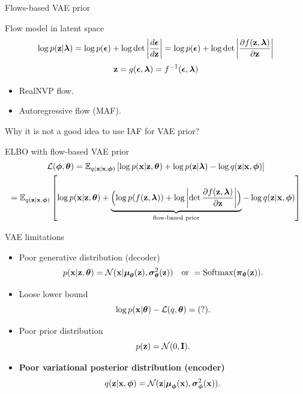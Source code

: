 \begin{frame}{Flows-based VAE prior}
	\begin{block}{Flow model in latent space}
		\vspace{-0.5cm}
		\[
			\log p(\mathbf{z} | \boldsymbol{\lambda}) = \log p(\boldsymbol{\epsilon}) + \log \det \left | \frac{d \boldsymbol{\epsilon}}{d\mathbf{z}}\right| = \log p(\boldsymbol{\epsilon}) + \log \det \left | \frac{\partial f(\mathbf{z}, \boldsymbol{\lambda})}{\partial \mathbf{z}}\right| 
		\]
		\[
			\mathbf{z} = g(\boldsymbol{\epsilon}, \boldsymbol{\lambda}) = f^{-1}(\boldsymbol{\epsilon}, \boldsymbol{\lambda})
		\]
	\end{block}
	\vspace{-0.3cm}
	\begin{itemize}
		\item RealNVP flow.
		\item Autoregressive flow (MAF).
	\end{itemize}
	Why it is not a good idea to use IAF for VAE prior?
	\begin{block}{ELBO with flow-based VAE prior}
		\vspace{-0.5cm}
		{\footnotesize
		\begin{multline*}
			\mathcal{L}(\boldsymbol{\phi}, \boldsymbol{\theta}) = \mathbb{E}_{q(\mathbf{z} | \mathbf{x}, \boldsymbol{\phi})} \left[ \log p(\mathbf{x} | \mathbf{z}, \boldsymbol{\theta}) +  \log p(\mathbf{z} | \boldsymbol{\lambda}) - \log q(\mathbf{z} | \mathbf{x}, \boldsymbol{\phi}) \right] \\
				= \mathbb{E}_{q(\mathbf{z} | \mathbf{x}, \boldsymbol{\phi})} \left[ \log p(\mathbf{x} | \mathbf{z}, \boldsymbol{\theta}) + \underbrace{ \Bigl( \log p(f(\mathbf{z}, \boldsymbol{\lambda})) + \log \left| \det \frac{\partial f(\mathbf{z}, \boldsymbol{\lambda})}{\partial \mathbf{z}} \right| \Bigr) }_{\text{flow-based prior}} - \log q(\mathbf{z} | \mathbf{x}, \boldsymbol{\phi}) \right] 
		\end{multline*}
		}
	\end{block}
\end{frame}
\begin{frame}{VAE limitations}
	\begin{itemize}
		\item Poor generative distribution (decoder)
		\[
			p(\mathbf{x} | \mathbf{z}, \boldsymbol{\theta}) = \mathcal{N}(\mathbf{x}| \boldsymbol{\mu}_{\boldsymbol{\theta}}(\mathbf{z}), \boldsymbol{\sigma}^2_{\boldsymbol{\theta}}(\mathbf{z})) \quad \text{or } = \text{Softmax}(\boldsymbol{\pi}_{\boldsymbol{\theta}}(\mathbf{z})).
		\]
		\item Loose lower bound
		\[
			\log p(\mathbf{x} | \boldsymbol{\theta}) - \mathcal{L}(q, \boldsymbol{\theta}) = (?).
		\]
		\item Poor prior distribution
		\[
			p(\mathbf{z}) = \mathcal{N}(0, \mathbf{I}).
		\]
		\item \textbf{Poor variational posterior distribution (encoder)}
		\[
			q(\mathbf{z} | \mathbf{x}, \boldsymbol{\phi}) = \mathcal{N}(\mathbf{z}| \boldsymbol{\mu}_{\boldsymbol{\phi}}(\mathbf{x}), \boldsymbol{\sigma}^2_{\boldsymbol{\phi}}(\mathbf{x})).
		\]
	\end{itemize}
\end{frame}
